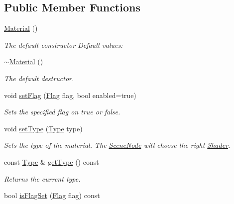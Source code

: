 \subsection*{Public Member Functions}
\begin{DoxyCompactItemize}
\item 
\hyperlink{classburn_1_1_material_a790cff05e96bd7956582777754a56a34}{Material} ()
\begin{DoxyCompactList}\small\item\em The default constructor Default values\-: \end{DoxyCompactList}\item 
\hyperlink{classburn_1_1_material_a449723d0d12182275e5d0d8a6a01f41d}{$\sim$\-Material} ()
\begin{DoxyCompactList}\small\item\em The default destructor. \end{DoxyCompactList}\item 
void \hyperlink{classburn_1_1_material_a833037afe81bc0aa52ceb4581b66087f}{set\-Flag} (\hyperlink{classburn_1_1_material_a704108f8bb133e1911495b84bd0826b8}{Flag} flag, bool enabled=true)
\begin{DoxyCompactList}\small\item\em Sets the specified flag on true or false. \end{DoxyCompactList}\item 
void \hyperlink{classburn_1_1_material_a287ad604c643dc76fc07d27b45ceecd2}{set\-Type} (\hyperlink{classburn_1_1_material_a2d219315cf05e59bbffe8e3831cc6c43}{Type} type)
\begin{DoxyCompactList}\small\item\em Sets the type of the material. The \hyperlink{classburn_1_1_scene_node}{Scene\-Node} will choose the right \hyperlink{classburn_1_1_shader}{Shader}. \end{DoxyCompactList}\item 
const \hyperlink{classburn_1_1_material_a2d219315cf05e59bbffe8e3831cc6c43}{Type} \& \hyperlink{classburn_1_1_material_afce65f6bded42bd03552741fe70649d8}{get\-Type} () const 
\begin{DoxyCompactList}\small\item\em Returns the current type. \end{DoxyCompactList}\item 
bool \hyperlink{classburn_1_1_material_afa32027c9de752c96b74e08b3f1e42af}{is\-Flag\-Set} (\hyperlink{classburn_1_1_material_a704108f8bb133e1911495b84bd0826b8}{Flag} flag) const 

\end{DoxyCompactItemize}
